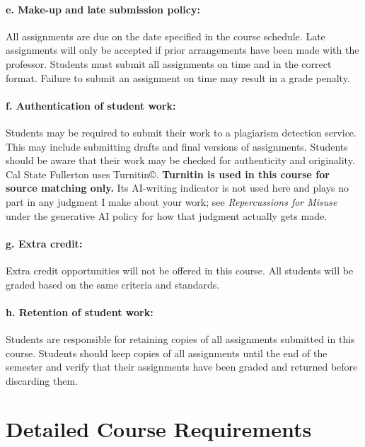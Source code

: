 \documentclass[11pt]{article}     %
\begin{document}
\vspace{1em}
\paragraph*{e. Make-up and late submission policy:}
All assignments are due on the date specified in the course schedule. Late assignments will only be accepted if prior arrangements have been made with the professor. Students must submit all assignments on time and in the correct format. Failure to submit an assignment on time may result in a grade penalty.

\vspace{1em}
\paragraph*{f. Authentication of student work:}
Students may be required to submit their work to a plagiarism detection service. This may include submitting drafts and final versions of assignments. Students should be aware that their work may be checked for authenticity and originality. Cal State Fullerton uses Turnitin\copyright. \textbf{Turnitin is used in this course for source matching only.} Its AI-writing indicator is not used here and plays no part in any judgment I make about your work; see \emph{Repercussions for Misuse} under the generative AI policy for how that judgment actually gets made.

\vspace{1em}
\paragraph*{g. Extra credit:}
Extra credit opportunities will not be offered in this course. All students will be graded based on the same criteria and standards.

\vspace{1em}
\paragraph*{h. Retention of student work:}
Students are responsible for retaining copies of all assignments submitted in this course. Students should keep copies of all assignments until the end of the semester and verify that their assignments have been graded and returned before discarding them.

\section*{Detailed Course Requirements}
\end{document}
